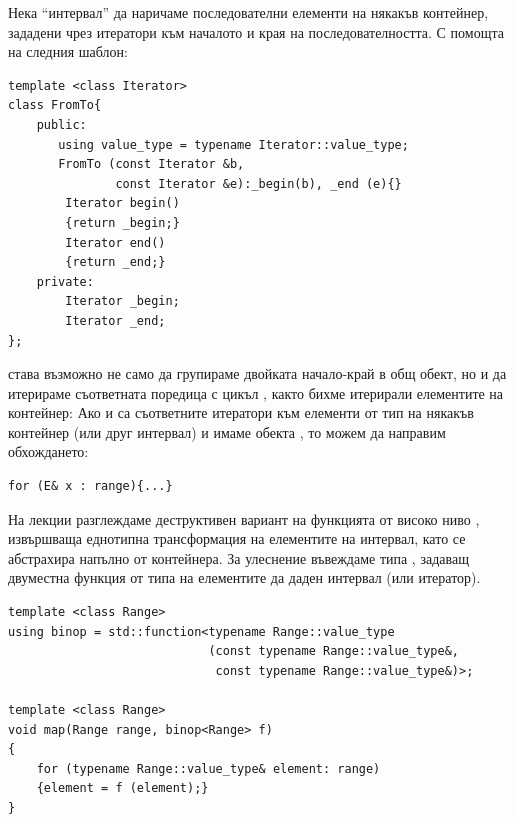 \begin{mdframed}[hidealllines=true,backgroundcolor=gray!20]
  Нека ``интервал'' да наричаме последователни елементи на някакъв контейнер, зададени чрез итератори към началото и края на последователността. С помощта на следния шаблон:
  \begin{verbatim}
template <class Iterator>
class FromTo{
    public:
       using value_type = typename Iterator::value_type;
       FromTo (const Iterator &b, 
               const Iterator &e):_begin(b), _end (e){}
        Iterator begin()
        {return _begin;}
        Iterator end()
        {return _end;}
    private:
        Iterator _begin;
        Iterator _end;
};
  \end{verbatim}

  става възможно не само да групираме двойката начало-край в общ обект, но и да итерираме съответната поредица с цикъл , както бихме итерирали елементите на контейнер: Ако  и  са съответните итератори към елементи от тип  на някакъв контейнер (или друг интервал) и имаме обекта , то можем да направим обхождането:
 \begin{verbatim}
for (E& x : range){...}   
 \end{verbatim}
 
 На лекции разглеждаме деструктивен вариант на функцията от високо ниво , извършваща еднотипна трансформация на елементите на интервал, като се абстрахира напълно от контейнера. За улеснение въвеждаме типа , задаващ двуместна функция от типа на елементите да даден интервал (или итератор).
  
\begin{verbatim}
template <class Range>
using binop = std::function<typename Range::value_type
                            (const typename Range::value_type&,
                             const typename Range::value_type&)>;

template <class Range>
void map(Range range, binop<Range> f)
{
    for (typename Range::value_type& element: range)
    {element = f (element);}    
}
\end{verbatim}


\end{mdframed}
